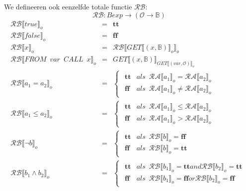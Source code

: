 \documentclass[12pt]{article}
\newcommand{\RA}{\mathcal{RA}}
\newcommand{\RB}{\mathcal{RB}}
\begin{document}
We defineeren ook eenzelfde totale functie $ \RB $:
\[ \RB : Bexp \rightarrow (\mathcal{O} \rightarrow \mathds{B} ) \]
\[
\begin{matrix}
\RB \llbracket true \rrbracket_o & = & \boldsymbol{tt}\\
\RB \llbracket false \rrbracket_o & = & \boldsymbol{ff}\\

\RB \llbracket x \rrbracket_o & = & \RB \llbracket GET\llbracket (x,\mathds{B}) \rrbracket_o \rrbracket_o\\

\RB \llbracket FROM \enspace var \enspace CALL \enspace x \rrbracket_o & = & GET\llbracket (x,\mathds{B}) \rrbracket_{GET\llbracket (var,\mathcal{O}) \rrbracket_o}\\

\RB \llbracket a_1 = a_2 \rrbracket_o & = &
\begin{cases}
\begin{matrix}
\boldsymbol{tt} & als \enspace \RA\llbracket a_1 \rrbracket_o = \RA\llbracket a_2 \rrbracket_o \\
\boldsymbol{ff} & als \enspace \RA\llbracket a_1 \rrbracket_o \not= \RA\llbracket a_2 \rrbracket_o
\end{matrix}
\end{cases}\\

\RB \llbracket a_1 \leq a_2 \rrbracket_o & = &
\begin{cases}
\begin{matrix}
\boldsymbol{tt} & als \enspace \RA\llbracket a_1 \rrbracket_o \leq \RA\llbracket a_2 \rrbracket_o \\
\boldsymbol{ff} & als \enspace \RA\llbracket a_1 \rrbracket_o > \RA\llbracket a_2 \rrbracket_o
\end{matrix}
\end{cases}\\

\RB \llbracket \neg b \rrbracket_o & = &
\begin{cases}
\begin{matrix}
\boldsymbol{tt} & als \enspace \RB\llbracket b \rrbracket_o = \boldsymbol{ff} \\
\boldsymbol{ff} & als \enspace \RB\llbracket b \rrbracket_o = \boldsymbol{tt}
\end{matrix}
\end{cases}\\

\RB \llbracket b_1 \wedge b_2 \rrbracket_o & = &
\begin{cases}
\begin{matrix}
\boldsymbol{tt} & als \enspace \RB\llbracket b_1 \rrbracket_o = \boldsymbol{tt} and \RB \llbracket b_2 \rrbracket_o = \boldsymbol{tt}\\
\boldsymbol{ff} & als \enspace \RB\llbracket b_1 \rrbracket_o = \boldsymbol{ff} or \RB \llbracket b_2 \rrbracket_o = \boldsymbol{ff}
\end{matrix}
\end{cases}\\

\end{matrix}
\]
\end{document}
